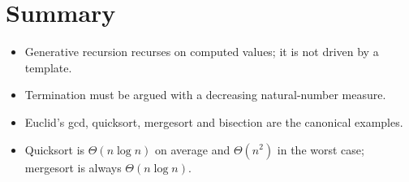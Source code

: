 \section{Summary}
\begin{itemize}
  \item Generative recursion recurses on computed values; it is not driven by a template.
  \item Termination must be argued with a decreasing natural-number measure.
  \item Euclid's gcd, quicksort, mergesort and bisection are the canonical examples.
  \item Quicksort is $\Theta(n \log n)$ on average and $\Theta(n^2)$ in the worst case; mergesort is always $\Theta(n \log n)$.
\end{itemize}
